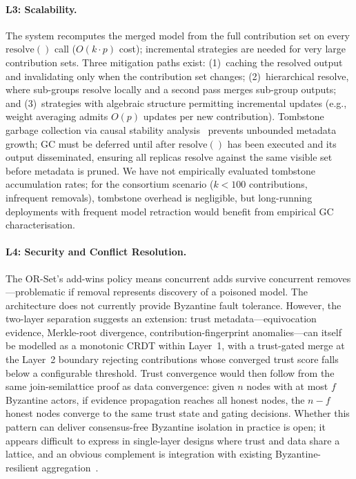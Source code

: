\documentclass[10pt,letterpaper]{article}
\begin{document}
\paragraph{L3: Scalability.}
The system recomputes the merged model from the full contribution set on every $\mathrm{resolve}()$ call ($O(k \cdot p)$ cost); incremental strategies are needed for very large contribution sets.
Three mitigation paths exist: (1)~caching the resolved output and invalidating only when the contribution set changes; (2)~hierarchical resolve, where sub-groups resolve locally and a second pass merges sub-group outputs; and (3)~strategies with algebraic structure permitting incremental updates (e.g., weight averaging admits $O(p)$ updates per new contribution).
Tombstone garbage collection via causal stability analysis~\cite{baquero2014making} prevents unbounded metadata growth; GC must be deferred until after $\mathrm{resolve}()$ has been executed and its output disseminated, ensuring all replicas resolve against the same visible set before metadata is pruned.
We have not empirically evaluated tombstone accumulation rates; for the consortium scenario ($k < 100$ contributions, infrequent removals), tombstone overhead is negligible, but long-running deployments with frequent model retraction would benefit from empirical GC characterisation.

\paragraph{L4: Security and Conflict Resolution.}
The OR-Set's add-wins policy means concurrent adds survive concurrent removes---problematic if removal represents discovery of a poisoned model.
The architecture does not currently provide Byzantine fault tolerance.
However, the two-layer separation suggests an extension: trust metadata---equivocation evidence, Merkle-root divergence, contribution-fingerprint anomalies---can itself be modelled as a monotonic CRDT within Layer~1, with a trust-gated merge at the Layer~2 boundary rejecting contributions whose converged trust score falls below a configurable threshold.
Trust convergence would then follow from the same join-semilattice proof as data convergence: given $n$ nodes with at most $f$ Byzantine actors, if evidence propagation reaches all honest nodes, the $n - f$ honest nodes converge to the same trust state and gating decisions.
Whether this pattern can deliver consensus-free Byzantine isolation in practice is open; it appears difficult to express in single-layer designs where trust and data share a lattice, and an obvious complement is integration with existing Byzantine-resilient aggregation~\cite{blanchard2017machine}.
\end{document}
